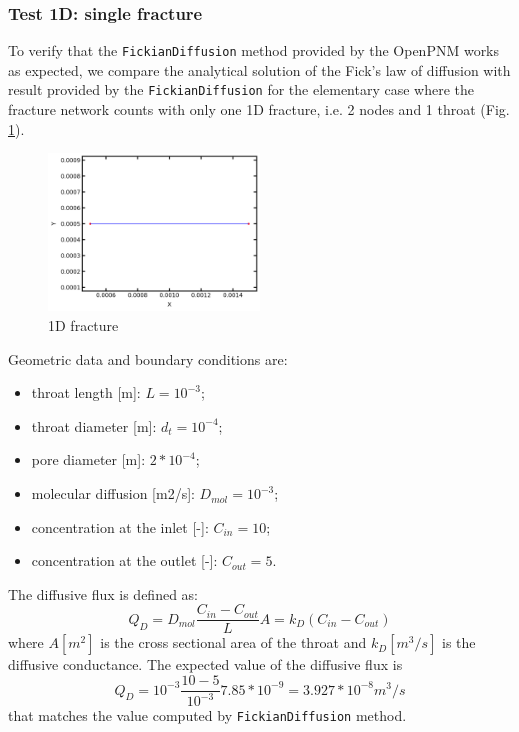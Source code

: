 \documentclass{article}
\begin{document}
\subsubsection{Test 1D: single fracture}
To  verify that the \texttt{FickianDiffusion} method provided by the OpenPNM works as expected, we compare the analytical solution of the Fick's law of diffusion with result provided by the \texttt{FickianDiffusion} for the elementary case where the fracture network counts with only one 1D fracture, i.e. 2 nodes and 1 throat (Fig. \ref{fig:OneFracture}).
\begin{figure}[h]
    \centering
    \includegraphics[width=0.5\textwidth]{images/fromOpenPNM/oneFracture.png}
    \caption{1D fracture}
    \label{fig:OneFracture}
\end{figure}
Geometric data and boundary conditions are:
\begin{itemize}
    \item throat length [m]: $L = 10^{-3}$;
    \item throat diameter [m]: $d_t = 10^{-4}$;
    \item pore diameter [m]: $2*10^{-4}$;
    \item molecular diffusion [m2/s]: $D_{mol} = 10^{-3}$;
    \item concentration at the inlet [-]: $C_{in} = 10$;
    \item concentration at the outlet [-]: $C_{out} = 5$.
\end{itemize}
The diffusive flux is defined as:
\begin{equation}
    Q_D = D_{mol} \frac{C_{in}-C_{out}}{L} A = k_D (C_{in}-C_{out})
\end{equation}
where $A [m^2]$ is the cross sectional area of the throat and $k_D [m^3/s]$ is the diffusive conductance.
The expected value of the diffusive flux is
\begin{equation}
    Q_D = 10^{-3} \frac{10-5}{10^{-3}} 7.85*10^{-9} = 3.927*10^{-8} m^3/s
\end{equation}
that matches the value computed by \texttt{FickianDiffusion} method.
\end{document}
